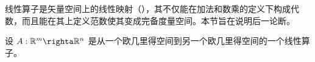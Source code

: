线性算子是矢量空间上的线性映射（），其不仅能在加法和数乘的定义下构成代数，而且能在其上定义范数使其变成完备度量空间。本节旨在说明后一论断。
\begin{definition}{}
设 $A:\mathbb R^m\righta \mathbb R^n$ 是从一个欧几里得空间到另一个欧几里得空间的一个线性算子。
\end{definition}